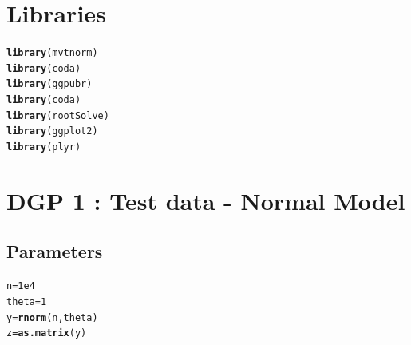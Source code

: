 \documentclass[11pt,a4paper]{report}\usepackage[]{graphicx}\usepackage[]{color}
\makeatletter
\newcommand{\hlnum}[1]{\textcolor[rgb]{0.686,0.059,0.569}{#1}}%
\newcommand{\hlstd}[1]{\textcolor[rgb]{0.345,0.345,0.345}{#1}}%
\newcommand{\hlkwb}[1]{\textcolor[rgb]{0.69,0.353,0.396}{#1}}%
\newcommand{\hlkwd}[1]{\textcolor[rgb]{0.737,0.353,0.396}{\textbf{#1}}}%
\newenvironment{kframe}{%
 \def\at@end@of@kframe{}%
 \ifinner\ifhmode%
  \def\at@end@of@kframe{\end{minipage}}%
  \begin{minipage}{\columnwidth}%
 \fi\fi%
 \def\FrameCommand##1{\hskip\@totalleftmargin \hskip-\fboxsep
 \colorbox{shadecolor}{##1}\hskip-\fboxsep
     \hskip-\linewidth \hskip-\@totalleftmargin \hskip\columnwidth}%
 \MakeFramed {\advance\hsize-\width
   \@totalleftmargin\z@ \linewidth\hsize
   \@setminipage}}%
 {\par\unskip\endMakeFramed%
 \at@end@of@kframe}
\newenvironment{knitrout}{}{} %
\makeatother
\begin{document}
\begin{appendix}
\section{Libraries}
\begin{knitrout}
\color{fgcolor}\begin{kframe}
\begin{alltt}
\hlkwd{library}\hlstd{(mvtnorm)}
\hlkwd{library}\hlstd{(coda)}
\hlkwd{library}\hlstd{(ggpubr)}
\hlkwd{library}\hlstd{(coda)}
\hlkwd{library}\hlstd{(rootSolve)}
\hlkwd{library}\hlstd{(ggplot2)}
\hlkwd{library}\hlstd{(plyr)}
\end{alltt}
\end{kframe}
\end{knitrout}

\section {DGP 1 : Test data - Normal Model}
\subsection{Parameters}
\begin{knitrout}
\color{fgcolor}\begin{kframe}
\begin{alltt}
\hlstd{n}\hlkwb{=}\hlnum{1e4}
\hlstd{theta}\hlkwb{=}\hlnum{1}
\hlstd{y}\hlkwb{=}\hlkwd{rnorm}\hlstd{(n,theta)}
\hlstd{z}\hlkwb{=}\hlkwd{as.matrix}\hlstd{(y)}
\end{alltt}
\end{kframe}
\end{knitrout}

\end{appendix}
\end{document}
